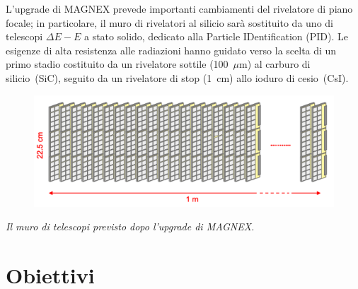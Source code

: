 \documentclass[10pt,foldmark,notumble]{leaflet}
\begin{document}
L'upgrade di MAGNEX prevede importanti cambiamenti del rivelatore di piano focale; in particolare, il muro di rivelatori al silicio sarà sostituito da uno di telescopi $\Delta E - E$ a stato solido, dedicato alla Particle IDentification (PID). 
Le esigenze di alta resistenza alle radiazioni hanno guidato verso la scelta di un primo stadio costituito da un rivelatore sottile (100~$\mu$m) al carburo di silicio~(SiC), seguito da un rivelatore di stop (1~cm) allo ioduro di cesio~(CsI).

\begin{figure} [!h]
	\centering
	\includegraphics[width=0.9\columnwidth, keepaspectratio]{Grafici/muro_telescopi.png}
\end{figure}
\hspace{0.2 cm}\textit{Il muro di telescopi previsto dopo l'upgrade di MAGNEX.}


\section{Obiettivi}
\end{document}
